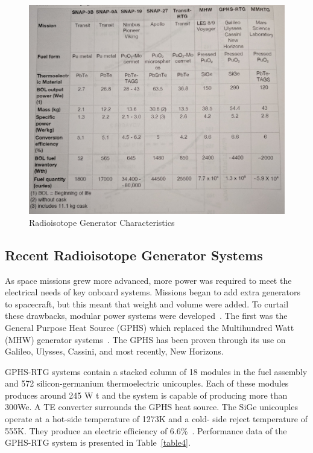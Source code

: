 \documentclass{article}
\begin{document}
\begin{figure}[]
	\centering
	\includegraphics[height=0.35\textheight]{fig/table3bis}
	\caption[Radioisotope Generator Characteristics]{Radioisotope Generator Characteristics~\cite{buden2011spacebook1}}
	\label{table3bis}
\end{figure}


\subsection{Recent Radioisotope Generator Systems}

As space missions grew more advanced, more power was required to meet the electrical
needs of key onboard systems. Missions began to add extra generators to spacecraft, but this
meant that weight and volume were added. To curtail these drawbacks, modular power
systems were developed~\cite{bennett2006mission}. The first was the General Purpose Heat Source (GPHS) which replaced
the Multihundred Watt (MHW) generator systems~\cite{kelly1975mhw}. The GPHS has been proven through its use
on Galileo, Ulysses, Cassini, and most recently, New Horizons.

GPHS-RTG systems contain a stacked column of 18 modules in the fuel assembly and
572 silicon-germanium thermoelectric unicouples. Each of these modules produces around 245
W t and the system is capable of producing more than 300We. A TE converter surrounds the
GPHS heat source. The SiGe unicouples operate at a hot-side temperature of 1273K and a cold-
side reject temperature of 555K. They produce an electric efficiency of 6.6\%~\cite{lange1984tutorial}. Performance data
of the GPHS-RTG system is presented in Table~\ref{table4}.
\end{document}
